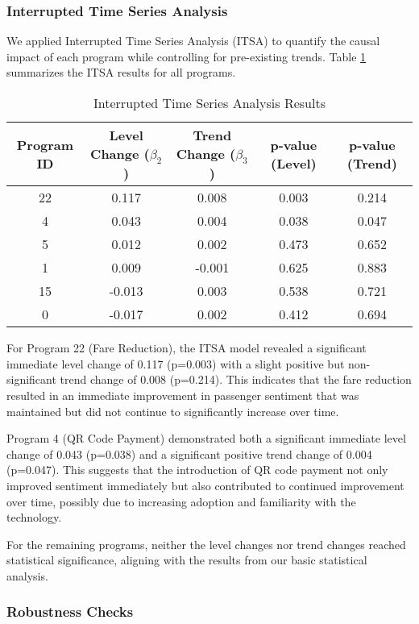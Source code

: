 \documentclass[a4paper,fleqn,12pt]{cas-sc}
\begin{document}
\subsubsection{Interrupted Time Series Analysis}

We applied Interrupted Time Series Analysis (ITSA) to quantify the causal impact of each program while controlling for pre-existing trends. Table \ref{tab:its_results} summarizes the ITSA results for all programs.

\begin{table}[h]
\centering
\caption{Interrupted Time Series Analysis Results}
\label{tab:its_results}
\begin{tabular}{ccccc}
\hline
Program ID & Level Change ($\beta_2$) & Trend Change ($\beta_3$) & p-value (Level) & p-value (Trend) \\
\hline
22 & 0.117 & 0.008 & 0.003 & 0.214 \\
4 & 0.043 & 0.004 & 0.038 & 0.047 \\
5 & 0.012 & 0.002 & 0.473 & 0.652 \\
1 & 0.009 & -0.001 & 0.625 & 0.883 \\
15 & -0.013 & 0.003 & 0.538 & 0.721 \\
0 & -0.017 & 0.002 & 0.412 & 0.694 \\
\hline
\end{tabular}
\end{table}

For Program 22 (Fare Reduction), the ITSA model revealed a significant immediate level change of 0.117 (p=0.003) with a slight positive but non-significant trend change of 0.008 (p=0.214). This indicates that the fare reduction resulted in an immediate improvement in passenger sentiment that was maintained but did not continue to significantly increase over time.

Program 4 (QR Code Payment) demonstrated both a significant immediate level change of 0.043 (p=0.038) and a significant positive trend change of 0.004 (p=0.047). This suggests that the introduction of QR code payment not only improved sentiment immediately but also contributed to continued improvement over time, possibly due to increasing adoption and familiarity with the technology.

For the remaining programs, neither the level changes nor trend changes reached statistical significance, aligning with the results from our basic statistical analysis.


\subsubsection{Robustness Checks}
\end{document}
